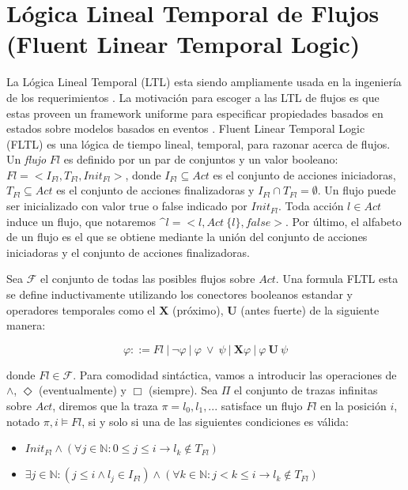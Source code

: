 \section{Lógica Lineal Temporal de Flujos (Fluent Linear Temporal Logic)}

La Lógica Lineal Temporal (LTL) esta siendo ampliamente usada en la ingeniería de los requerimientos
\cite{1347546,Giannakopoulou:2003:FMC:940071.940106,879820,Letier:2002:ATG:581339.581353}. La motivación para escoger a
las LTL de flujos es que estas proveen un framework uniforme para especificar propiedades basados en estados sobre
modelos basados en eventos \cite{Giannakopoulou:2003:FMC:940071.940106}. Fluent Linear Temporal Logic (FLTL) \cite{Giannakopoulou:2003:FMC:940071.940106}
es una lógica de tiempo lineal, temporal, para razonar acerca de flujos. Un \emph{flujo} $Fl$ es definido por un par de
conjuntos y un valor booleano: $Fl = <I_{Fl},T_{Fl},Init_{Fl}>$, donde $I_{Fl} \subseteq Act$ es el conjunto de acciones
iniciadoras, $T_{Fl} \subseteq Act$ es el conjunto de acciones finalizadoras y $I_{Fl} \cap T_{Fl} = \emptyset$. Un
flujo puede ser inicializado con valor true o false indicado por $Init_{Fl}$. Toda acción $l \in Act$ induce un flujo,
que notaremos $\^l = <l, Act \ \{l\}, false>$. Por último, el alfabeto de un flujo es el que se obtiene mediante la
unión del conjunto de acciones iniciadoras y el conjunto de acciones finalizadoras.

Sea $\mathcal{F}$ el conjunto de todas las posibles flujos sobre $Act$. Una formula FLTL esta se define inductivamente
utilizando los conectores booleanos estandar y operadores temporales como el $\mathbf{X}$ (próximo), $\mathbf{U}$ (antes
fuerte) de la
siguiente manera:

\begin{center}
\begin{equation*}
    \varphi ::= Fl\ |\ \neg\varphi\ |\ \varphi\ \lor\ \psi\ |\ \mathbf{X} \varphi\ |\ \varphi\ \mathbf{U}\ \psi
\end{equation*}
\end{center}

\noindent donde $Fl \in \mathcal{F}$. Para comodidad sintáctica, vamos a introducir las operaciones de $\land$,
$\Diamond$ (eventualmente) y $\Box$ (siempre). Sea $\Pi$ el conjunto de trazas infinitas sobre $Act$, diremos que la
traza $\pi = l_0,l_1,...$ satisface un flujo $Fl$ en la posición $i$, notado $\pi,i\vDash Fl$, si y solo si una de las
siguientes condiciones es válida:

\begin{itemize}
    \item $Init_{Fl} \land (\forall j \in \mathbb{N}: 0 \leq j \leq i \rightarrow l_k \notin T_{Fl} )$
    \item $\exists j \in \mathbb{N}: (j \leq i \land l_j \in I_{Fl}) \land (\forall k \in \mathbb{N}: j < k \leq i
    \rightarrow l_k \notin T_{Fl})$
\end{itemize}

